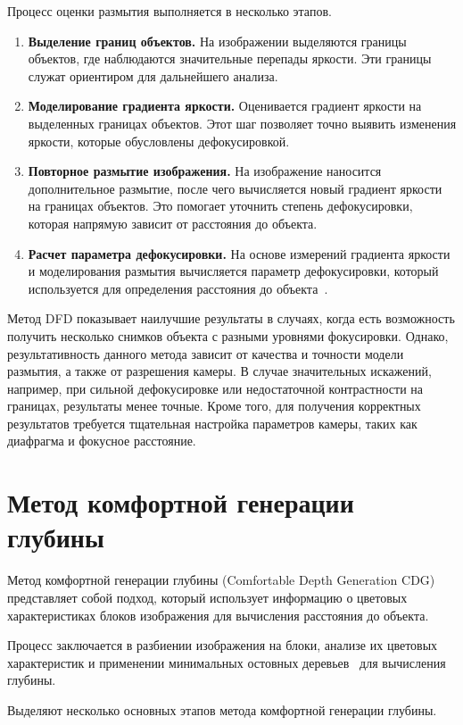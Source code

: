 Процесс оценки размытия выполняется в несколько этапов.

\begin{enumerate}[label=\arabic*.]
\item \textbf{Выделение границ объектов.}
На изображении выделяются границы объектов, где наблюдаются значительные перепады яркости.
Эти границы служат ориентиром для дальнейшего анализа.
\item \textbf{Моделирование градиента яркости.}
Оценивается градиент яркости на выделенных границах объектов.
Этот шаг позволяет точно выявить изменения яркости, которые обусловлены дефокусировкой.
\item \textbf{Повторное размытие изображения.}
На изображение наносится дополнительное размытие, после чего вычисляется новый градиент яркости на границах объектов.
Это помогает уточнить степень дефокусировки, которая напрямую зависит от расстояния до объекта.
\item \textbf{Расчет параметра дефокусировки.}
На основе измерений градиента яркости и моделирования размытия вычисляется параметр дефокусировки, который используется для определения расстояния до объекта~\cite{dfd}.
\end{enumerate}

Метод DFD показывает наилучшие результаты в случаях, когда есть возможность получить несколько снимков объекта с разными уровнями фокусировки.
Однако, результативность данного метода зависит от качества и точности модели размытия, а также от разрешения камеры.
В случае значительных искажений, например, при сильной дефокусировке или недостаточной контрастности на границах,
результаты менее точные.
Кроме того, для получения корректных результатов требуется тщательная настройка параметров камеры,
таких как диафрагма и фокусное расстояние.

\section{Метод комфортной генерации глубины}

Метод комфортной генерации глубины (Comfortable Depth Generation CDG) представляет собой подход,
который использует информацию о цветовых характеристиках блоков изображения для вычисления расстояния до объекта.

Процесс заключается в разбиении изображения на блоки, анализе их цветовых характеристик и применении минимальных остовных деревьев~\cite{minderev} для вычисления глубины.

Выделяют несколько основных этапов метода комфортной генерации глубины.

